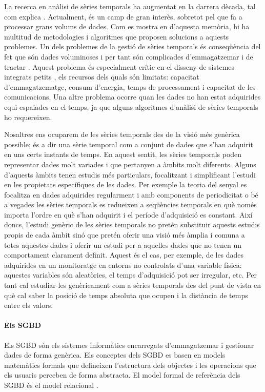 La recerca en anàlisi de sèries temporals ha augmentat en la darrera
dècada, tal com explica \textcite{fu11}. Actualment, és un camp de
gran interès, sobretot pel que fa a processar grans volums de dades.
Com es mostra en  d'aquesta memòria, hi ha multitud
de metodologies i algoritmes que proposen solucions a aquests
problemes. Un dels problemes de la gestió de sèries temporals és
conseqüència del fet que són dades voluminoses i per tant són
complicades d'emmagatzemar i de tractar \cite{fu11,keogh08:isax}.
Aquest problema és especialment crític en el disseny de sistemes
integrats petits \cite{yaogehrke02}, els recursos dels quals són
limitats: capacitat d'emmagatzematge, consum d'energia, temps de
processament i capacitat de les comunicacions.  Una altre problema
ocorre quan les dades no han estat adquirides equi-espaiades en el
temps, ja que alguns algoritmes d'anàlisi de sèries temporals ho
requereixen.


Nosaltres ens ocuparem de les sèries temporals des de la visió més
genèrica possible; és a dir una sèrie temporal com a conjunt de dades
que s'han adquirit en uns certs instants de temps.  En aquest sentit,
les sèries temporals poden representar dades molt variades i que
pertanyen a àmbits molt diferents. Alguns d'aquests àmbits tenen
estudis més particulars, focalitzant i simplificant l'estudi en les
propietats específiques de les dades. Per exemple la teoria del senyal
es focalitza en dades adquirides regularment i amb components de
periodicitat o bé a vegades les sèries temporals es redueixen a
seqüències temporals en què només importa l'ordre en què s'han
adquirit i el període d'adquisició es constant.  Així doncs, l'estudi
genèric de les sèries temporals no pretén substituir aquests estudis
propis de cada àmbit sinó que pretén oferir una visió més àmplia i
comuna a totes aquestes dades i oferir un estudi per a aquelles dades
que no tenen un comportament clarament definit. Aquest és el cas, per
exemple, de les dades adquirides en un monitoratge en entorns no
controlats d'una variable física: aquestes variables són aleatòries,
el temps d'adquisició pot ser irregular, etc. Per tant cal
estudiar-les genèricament com a sèries temporals des del punt de vista
en què cal saber la posició de temps absoluta que ocupen i la
distància de temps entre els valors.





\paragraph{Els SGBD}
Els \gls{SGBD} són els sistemes informàtics encarregats d'emmagatzemar
i gestionar dades de forma genèrica. Els conceptes dels \gls{SGBD} es
basen en models matemàtics formals que defineixen l'estructura dels
objectes i les operacions que els usuaris perceben de forma
abstracta. El model formal de referència dels \gls{SGBD} és el model
relacional \parencite{date04:introduction8}.


